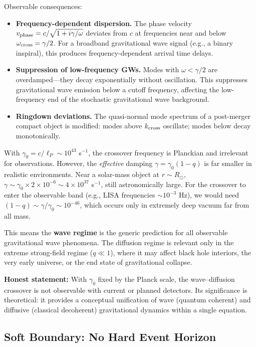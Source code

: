 \documentclass[aps,prd,twocolumn,showpacs,superscriptaddress,preprintnumbers]{revtex4-2}
\begin{document}
Observable consequences:
\begin{itemize}
    \item \textbf{Frequency-dependent dispersion.} The phase velocity $v_{\rm phase}=c/\sqrt{1+i\gamma/\omega}$ deviates from $c$ at frequencies near and below $\omega_{\rm cross}=\gamma/2$. For a broadband gravitational wave signal (e.g., a binary inspiral), this produces frequency-dependent arrival time delays.

    \item \textbf{Suppression of low-frequency GWs.} Modes with $\omega<\gamma/2$ are overdamped---they decay exponentially without oscillation.
    This suppresses gravitational wave emission below a cutoff frequency, affecting the low-frequency end of the stochastic gravitational wave background.

    \item \textbf{Ringdown deviations.} The quasi-normal mode spectrum of a post-merger compact object is modified: modes above $k_{\rm cross}$ oscillate; modes below decay monotonically.
\end{itemize}

With $\gamma_0=c/\ell_P\sim10^{43}$ s$^{-1}$, the crossover frequency is Planckian and irrelevant for observations.
However, the \emph{effective} damping $\gamma=\gamma_0(1-q)$ is far smaller in realistic environments.
Near a solar-mass object at $r\sim R_\odot$, $\gamma\sim\gamma_0\times2\times10^{-6}\sim4\times10^{37}$ s$^{-1}$, still astronomically large.
For the crossover to enter the observable band (e.g., LISA frequencies $\sim10^{-3}$ Hz), we would need $(1-q)\sim\gamma/\gamma_0\sim10^{-46}$, which occurs only in extremely deep vacuum far from all mass.

This means the \textbf{wave regime} is the generic prediction for all observable gravitational wave phenomena.
The diffusion regime is relevant only in the extreme strong-field regime ($q\ll1$), where it may affect black hole interiors, the very early universe, or the end state of gravitational collapse.

\textbf{Honest statement:} With $\gamma_0$ fixed by the Planck scale, the wave--diffusion crossover is not observable with current or planned detectors.
Its significance is theoretical: it provides a conceptual unification of wave (quantum coherent) and diffusive (classical decoherent) gravitational dynamics within a single equation.

\subsection{Soft Boundary: No Hard Event Horizon}
\end{document}
